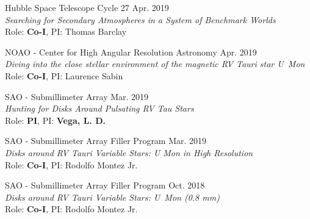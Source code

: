 \documentclass[letter,12pt]{article}
\begin{document}
\begin{etaremune}
\item Hubble Space Telescope Cycle 27 \hfill Apr. 2019 \\
\textit{Searching for Secondary Atmospheres in a System of Benchmark Worlds} \\ Role: \textbf{Co-I}, PI: Thomas Barclay

\item NOAO - Center for High Angular Resolution Astronomy \hfill Apr. 2019\\
\textit{Diving into the close stellar environment of the magnetic
RV Tauri star U~Mon} \\ Role: \textbf{Co-I}, PI: Laurence Sabin

\item SAO - Submillimeter Array \hfill Mar. 2019 \\
 \textit{Hunting for Disks Around Pulsating RV Tau Stars} \\ Role: \textbf{PI}, PI: \textbf{Vega, L. D.}

\item SAO - Submillimeter Array Filler Program \hfill Mar. 2019 \\
\textit{Disks around RV Tauri Variable Stars: U Mon in High Resolution} \\ Role: \textbf{Co-I}, PI: Rodolfo Montez Jr.

\item SAO - Submillimeter Array Filler Program \hfill Oct. 2018 \\
\textit{Disks around RV Tauri Variable Stars: U~Mon (0.8 mm)} \\ Role: \textbf{Co-I}, PI: Rodolfo Montez Jr.





\end{etaremune}
\end{document}

